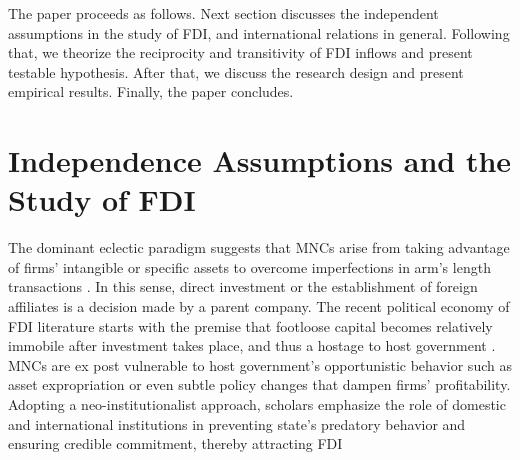 \documentclass[12pt]{article}
\begin{document}
The paper proceeds as follows. Next section discusses the independent assumptions in the study of FDI, and international relations in general. Following that, we theorize the reciprocity and transitivity of FDI inflows and present testable hypothesis. After that, we discuss the research design and present empirical results. Finally, the paper concludes.








\section{Independence Assumptions and the Study of FDI}

The dominant eclectic paradigm suggests that MNCs arise from taking advantage of firms' intangible or specific assets to overcome imperfections in arm's length transactions \citep{Caves:1996,Dunning:1992}. In this sense, direct investment or the establishment of foreign affiliates is a decision made by a parent company. The recent political economy of FDI literature starts with the premise that footloose capital becomes relatively immobile after investment takes place, and thus a hostage to host government \citep{Vernon:1971,Vernon:1980}. MNCs are ex post vulnerable to host government's opportunistic behavior such as asset expropriation or even subtle policy changes that dampen firms' profitability. Adopting a neo-institutionalist approach, scholars emphasize the role of domestic and international institutions in preventing state's predatory behavior and ensuring credible commitment, thereby attracting FDI \citep[e.g.][]{Henisz:2000,Jensen:2003,Jensen:2006,Li_Resnick:2003,Staats_Biglaiser:2012,Buthe_Milner:2008,Allee_Peinhardt:2011}
\end{document}
